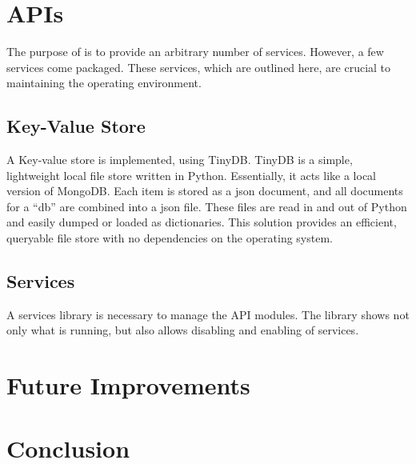 \section{APIs}

The purpose of \projectname is to provide an arbitrary number of services. However, a few services come packaged. These services, which are outlined here, are crucial to maintaining the operating environment.

\subsection{Key-Value Store}

A Key-value store is implemented, using TinyDB. TinyDB is a simple, lightweight local file store written in Python. Essentially, it acts like a local version of MongoDB. Each item is stored as a json document, and all documents for a ``db'' are combined into a json file. These files are read in and out of Python and easily dumped or loaded as dictionaries. This solution provides an efficient, queryable file store with no dependencies on the operating system.\cite{hid-sp18-526-www-tinydb}

\subsection{Services}

A services library is necessary to manage the API modules. The library shows not only what is running, but also allows disabling and enabling of services.

\section{Future Improvements}

\section{Conclusion}




